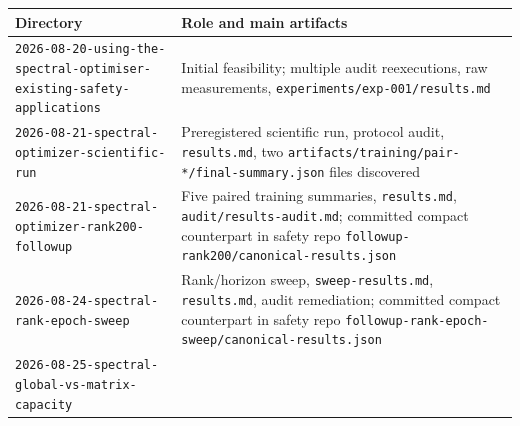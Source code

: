 \documentclass[
  british,
  10pt,
  a4paper,
]{article}
\newcounter{none} %
\begin{document}
{\def\LTcaptype{none} %
\begin{longtable}[]{@{}
  >{\raggedright\arraybackslash}p{}
  >{\raggedright\arraybackslash}p{}@{}}
\toprule\noalign{}
\begin{minipage}[b]{\linewidth}\raggedright
Directory
\end{minipage} & \begin{minipage}[b]{\linewidth}\raggedright
Role and main artifacts
\end{minipage} \\
\midrule\noalign{}
\endhead
\bottomrule\noalign{}
\endlastfoot
\texttt{2026-\allowbreak{}08-\allowbreak{}20-\allowbreak{}using-\allowbreak{}the-\allowbreak{}spectral-\allowbreak{}optimiser-\allowbreak{}existing-\allowbreak{}safety-\allowbreak{}applications\allowbreak{}}
& Initial feasibility; multiple audit
reexecutions\allowbreak{},\allowbreak{} raw
measurements\allowbreak{},\allowbreak{}
\texttt{experiments/\allowbreak{}exp-\allowbreak{}001/\allowbreak{}results.\allowbreak{}md} \\
\texttt{2026-\allowbreak{}08-\allowbreak{}21-\allowbreak{}spectral-\allowbreak{}optimizer-\allowbreak{}scientific-\allowbreak{}run}
& Preregistered scientific run, protocol audit, \texttt{results.md}, two
\texttt{artifacts/\allowbreak{}training/\allowbreak{}pair-\allowbreak{}*/\allowbreak{}final-\allowbreak{}summary.\allowbreak{}json}
files discovered \\
\texttt{2026-\allowbreak{}08-\allowbreak{}21-\allowbreak{}spectral-\allowbreak{}optimizer-\allowbreak{}rank200-\allowbreak{}followup}
& Five paired training summaries, \texttt{results.md},
\texttt{audit/\allowbreak{}results-\allowbreak{}audit.\allowbreak{}md};
committed compact counterpart in safety repo
\texttt{followup-\allowbreak{}rank200/\allowbreak{}canonical-\allowbreak{}results.\allowbreak{}json} \\
\texttt{2026-\allowbreak{}08-\allowbreak{}24-\allowbreak{}spectral-\allowbreak{}rank-\allowbreak{}epoch-\allowbreak{}sweep}
& Rank/\allowbreak{}horizon sweep,
\texttt{sweep-\allowbreak{}results.\allowbreak{}md},
\texttt{results.md}, audit remediation; committed compact counterpart in
safety repo
\texttt{followup-\allowbreak{}rank-\allowbreak{}epoch-\allowbreak{}sweep/\allowbreak{}canonical-\allowbreak{}results.\allowbreak{}json} \\
\texttt{2026-\allowbreak{}08-\allowbreak{}25-\allowbreak{}spectral-\allowbreak{}global-\allowbreak{}vs-\allowbreak{}matrix-\allowbreak{}capacity}

\end{longtable}}
\end{document}
